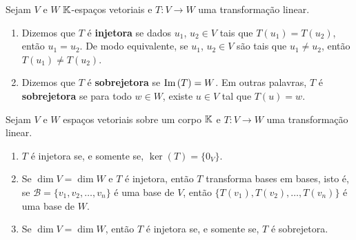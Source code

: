 \documentclass{beamer}
\begin{document}
\begin{frame}
    \begin{definicao}
        Sejam $V$ e $W$ $\mathbb{K}$-espa\c{c}os vetoriais  e $T \colon V \to W$ uma transforma\c{c}\~ao linear.
        \begin{enumerate}[label={\roman*})]
            \item Dizemos que $T$ \'e \textbf{injetora}  se dados $u_1$, $u_2 \in V$  tais que $T(u_1) = T(u_2)$,  ent\~ao $u_1 = u_2$.  De modo equivalente,  se $u_1$, $u_2 \in V$ s\~ao tais que $u_1 \ne u_2$,  ent\~ao $T(u_1) \ne T(u_2)$.

            \vspace{.5cm}

            \item Dizemos que $T$ \'e \textbf{sobrejetora}  se ${\rm Im\,}(T) = W$.  Em outras palavras,  $T$ \'e \textbf{sobrejetora} se para todo $w \in W$,  existe $u \in V$ tal que $T(u) = w$.
        \end{enumerate}
    \end{definicao}
\end{frame}

\begin{frame}
    \begin{proposicao}\label{caracteriza_transformacao_injetora}
        Sejam $V$ e $W$ espa\c{c}os vetoriais sobre um corpo $\mathbb{K}$  e $T \colon V \to W$ uma transforma\c{c}\~ao linear.
        \begin{enumerate}[label={\roman*})]
            \item $T$ \'e injetora  se, e somente se, $\ker(T) = \{0_V\}$.

            \vspace{.5cm}

            \item Se $\dim V = \dim W$  e $T$ é injetora,  então $T$ transforma bases em bases,  isto é, se $\mathcal{B} = \{v_1, v_2, \dots, v_n\}$ é uma base de $V$,  então $\{T(v_1),  T(v_2),  \dots, T(v_n)\}$ é uma base de $W$.

            \vspace{.5cm}

            \item Se $\dim V = \dim W$,  então $T$ é injetora  se, e somente se,  $T$ é sobrejetora.
        \end{enumerate}
    \end{proposicao}
\end{frame}
\end{document}

